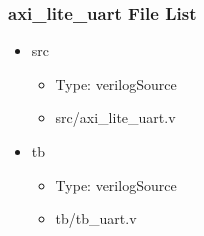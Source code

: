 \subsubsection{axi\_lite\_uart File List}
\begin{itemize}
\item src
	\begin{itemize}
	\item[$\space$] Type: verilogSource
	\item src/axi\_lite\_uart.v
	\end{itemize}
\item tb
	\begin{itemize}
	\item[$\space$] Type: verilogSource
	\item tb/tb\_uart.v
	\end{itemize}
\end{itemize}

